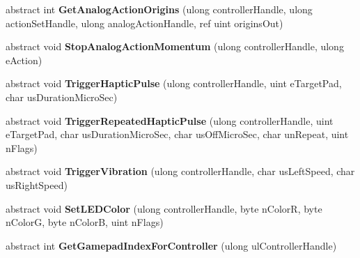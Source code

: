 \begin{DoxyCompactItemize}
abstract int {\bfseries Get\+Analog\+Action\+Origins} (ulong controller\+Handle, ulong action\+Set\+Handle, ulong analog\+Action\+Handle, ref uint origins\+Out)
\item 
\mbox{\label{class_valve_1_1_steamworks_1_1_i_steam_controller_a4ce1f56bc001e19941d10d729529250f}} 
abstract void {\bfseries Stop\+Analog\+Action\+Momentum} (ulong controller\+Handle, ulong e\+Action)
\item 
\mbox{\label{class_valve_1_1_steamworks_1_1_i_steam_controller_ab8b9b4cb73dda569fd4c90358fb02d92}} 
abstract void {\bfseries Trigger\+Haptic\+Pulse} (ulong controller\+Handle, uint e\+Target\+Pad, char us\+Duration\+Micro\+Sec)
\item 
\mbox{\label{class_valve_1_1_steamworks_1_1_i_steam_controller_a4ad2ce18513e9ff1f0012062cb217ff9}} 
abstract void {\bfseries Trigger\+Repeated\+Haptic\+Pulse} (ulong controller\+Handle, uint e\+Target\+Pad, char us\+Duration\+Micro\+Sec, char us\+Off\+Micro\+Sec, char un\+Repeat, uint n\+Flags)
\item 
\mbox{\label{class_valve_1_1_steamworks_1_1_i_steam_controller_a7821953dbf8bee56c9c3808059e5877b}} 
abstract void {\bfseries Trigger\+Vibration} (ulong controller\+Handle, char us\+Left\+Speed, char us\+Right\+Speed)
\item 
\mbox{\label{class_valve_1_1_steamworks_1_1_i_steam_controller_ad54f56fedbee0e54b0903eb000b80ac4}} 
abstract void {\bfseries Set\+L\+E\+D\+Color} (ulong controller\+Handle, byte n\+ColorR, byte n\+ColorG, byte n\+ColorB, uint n\+Flags)
\item 
\mbox{\label{class_valve_1_1_steamworks_1_1_i_steam_controller_ac9f6bc6ba50a5fae14bbf16a195ee7a7}} 
abstract int {\bfseries Get\+Gamepad\+Index\+For\+Controller} (ulong ul\+Controller\+Handle)
\item 
\mbox{\label{class_valve_1_1_steamworks_1_1_i_steam_controller_abf0f8a574d5382f2f64c8cec8d6fe0e5}} 

\end{DoxyCompactItemize}
